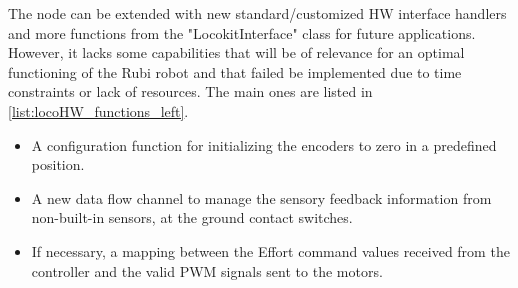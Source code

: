 The node can be extended with new standard/customized HW interface handlers and more functions from the "LocokitInterface" class for future applications.
However, it lacks some capabilities that will be of relevance for an optimal functioning of the Rubi robot and that failed be implemented due to time constraints or lack of resources. 
The main ones are listed in \ref{list:locoHW_functions_left}.

\begin{itemize}
\label{list:locoHW_functions_left}
	\item A configuration function for initializing the encoders to zero in a predefined position.
	\item A new data flow channel to manage the sensory feedback information from non-built-in sensors, at the ground contact switches.
	\item If necessary, a mapping between the Effort command values received from the controller and the valid PWM signals sent to the motors.  
\end{itemize}





